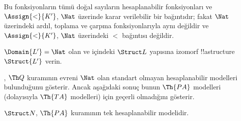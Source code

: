 \documentclass[../../../include/open-logic-section]{subfiles}
\begin{document}
\begin{ex}
Bu fonksiyonların tümü doğal sayıların hesaplanabilir fonksiyonları ve
$\Assign{<}{K'}$, $\Nat$ üzerinde karar verilebilir bir bağıntıdır;
fakat $\Nat$ üzerindeki ardıl, toplama ve çarpma fonksiyonlarıyla aynı
değildir ve $\Assign{<}{K'}$, $\Nat$ üzerindeki $<$ bağıntısı değildir.
\end{ex}

\begin{prob}
$\Domain{L'}=\Nat$ olan ve
 içindeki $\Struct L$ yapısına
izomorf !!a{structure}~$\Struct{L'}$ verin.
\end{prob}

\begin{explain}
, $\Th Q$ kuramının evreni $\Nat$ olan standart
olmayan hesaplanabilir modelleri bulunduğunu gösterir. Ancak aşağıdaki
sonuç bunun $\Th{PA}$ modelleri (dolayısıyla $\Th{TA}$ modelleri) için
geçerli olmadığını gösterir.
\end{explain}

\begin{thm}
$\Struct N$, $\Th{PA}$ kuramının tek hesaplanabilir modelidir.
\end{thm}
\end{document}
